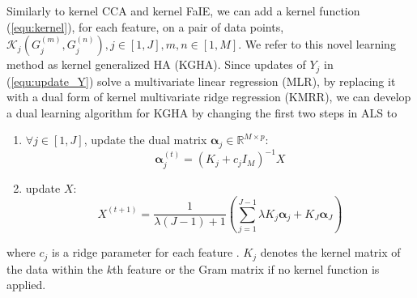 \documentclass[a4paper]{article}
\begin{document}
Similarly to kernel CCA and kernel FaIE, we can add a kernel function (\ref{equ:kernel}), for each feature, on a pair of data points,     
$\mathcal{K}_j(G_j^{(m)},G_j^{(n)}), j\in [1,J], m,n\in [1,M]$. We refer to this novel learning method as kernel generalized HA (KGHA).   
Since updates of $Y_j$ in (\ref{equ:update_Y}) solve a multivariate linear regression (MLR), by replacing it with a dual form of kernel multivariate ridge regression (KMRR), 
we can develop a dual learning algorithm for KGHA by changing the first two steps in ALS to
\begin{enumerate}
    \item $\forall j\in[1,J]$, update the dual matrix $\boldsymbol{\alpha}_j\in \mathbb{R}^{M\times p}$: 
  \begin{equation}
      \boldsymbol{\alpha}_j^{(t)}=(K_j+c_j I_M) ^{-1}X
    \label{equ:update_alpha}
  \end{equation}
  \item update $X$:
    \begin{equation} 
        X^{(t+1)}=\frac{1}{\lambda(J-1)+1} \left(\sum_{j=1}^{J-1}\lambda K_j\boldsymbol{\alpha}_j + K_J\boldsymbol{\alpha}_J \right) 
    \end{equation}
\end{enumerate}
where $c_j$ is a ridge parameter for each feature
. $K_j$ denotes the kernel matrix of the
data within the $k$th feature or the Gram matrix if no kernel function is applied.   
\end{document}
